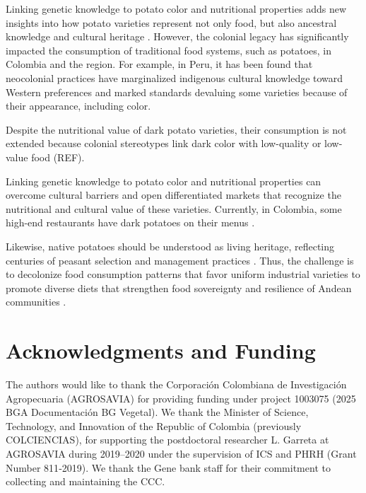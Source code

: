 \documentclass[pdflatex,sn-mathphys-ay]{sn-jnl}%
\begin{document}
Linking genetic knowledge to potato color and nutritional properties adds new insights into how potato varieties represent not only food, but also ancestral knowledge and cultural heritage \citep{galvis2022cultural}. However, the colonial legacy has significantly impacted the consumption of traditional food systems, such as potatoes, in Colombia and the region. For example, in Peru, it has been found that neocolonial practices have marginalized indigenous cultural knowledge toward Western preferences and marked standards devaluing some varieties because of their appearance, including color. 

Despite the nutritional value of dark potato varieties, their consumption is not extended because colonial stereotypes link dark color with low-quality or low-value food (REF). 

Linking genetic knowledge to potato color and nutritional properties can overcome cultural barriers and open differentiated markets that recognize the nutritional and cultural value of these varieties. Currently, in Colombia, some high-end restaurants have dark potatoes on their menus \citep{RadioNacional2022}. 

Likewise, native potatoes should be understood as living heritage, reflecting centuries of peasant selection and management practices \citep{arcespatial,luttringhaus2021dynamic}. Thus, the challenge is to decolonize food consumption patterns that favor uniform industrial varieties to promote diverse diets that strengthen food sovereignty and resilience of Andean communities \citep{dawson2023identifying}.









\section{Acknowledgments and Funding}


The authors would like to thank the Corporación Colombiana de Investigación Agropecuaria (AGROSAVIA) for providing funding under project 1003075 (2025 BGA Documentación BG Vegetal). 
 We thank the Minister of Science, Technology, and Innovation of the Republic of Colombia (previously COLCIENCIAS), for supporting the postdoctoral researcher L. Garreta at AGROSAVIA during 2019–2020 under the supervision of ICS and PHRH (Grant Number 811‐2019).  We thank the Gene bank staff for their commitment to collecting and maintaining the CCC. 

\end{document}
